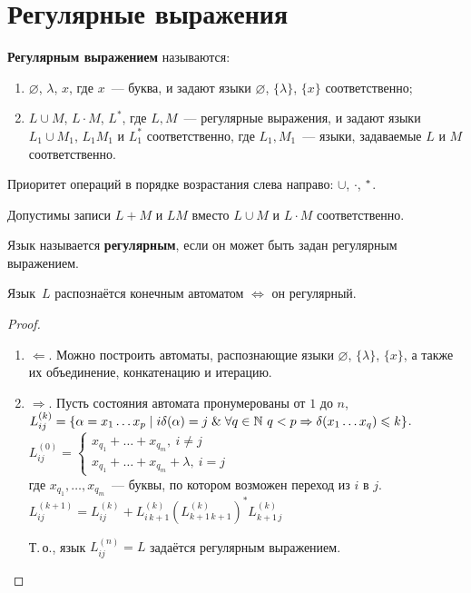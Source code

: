 \section{Регулярные выражения}
 \textbf{Регулярным выражением} называются:
\begin{enumerate}
	\item $\varnothing$, $\lambda$, $x$, где $x$~--- буква, и задают языки $\varnothing$, $\{ \lambda \}$, $\{ x \}$ соответственно;
	\item $L \cup M$, $L \cdot M$, $L^*$, где $L, M$~--- регулярные выражения, и задают языки $L_1 \cup M_1$, $L_1 M_1$ и $L_1^*$ соответственно, где $L_1, M_1$~--- языки, задаваемые $L$ и $M$ соответственно.
\end{enumerate}

Приоритет операций в порядке возрастания слева направо: $\cup$, $\cdot$, $\vphantom{L}^*$.

Допустимы записи $L + M$ и $LM$ вместо $L \cup M$ и $L \cdot M$ соответственно.

 Язык называется \textbf{регулярным}, если он может быть задан регулярным выражением.

\begin{theorem}[Клини]
Язык~$L$ распознаётся конечным автоматом $\Leftrightarrow$ он регулярный.
\end{theorem}
\begin{proof}
\begin{enumerate}
	\item $\Leftarrow$. Можно построить автоматы, распознающие языки $\varnothing$, $\{ \lambda \}$, $\{ x \}$, а также их объединение, конкатенацию и итерацию.
	\item $\Rightarrow$. Пусть состояния автомата пронумерованы от $1$ до $n$, $L_{ij}^{(k)} = \{ \alpha = x_1 \ldots x_p \mid i \delta(\alpha) = j \lAnd \forall q \in \mathbb N \ \allowbreak q < p \opbr\Rightarrow \delta(x_1 \ldots x_q) \leqslant k \}$.
		\indbase $L_{ij}^{(0)} =
		\begin{cases}
		x_{q_1} + \ldots + x_{q_m}, \ i \neq j \\
		x_{q_1} + \ldots + x_{q_m} + \lambda, \ i = j
		\end{cases}$\\
		где $x_{q_1}, \ldots, x_{q_m}$~--- буквы, по котором возможен переход из $i$ в $j$.
		\indstep $L_{ij}^{(k+1)} = L_{ij}^{(k)} + L_{i\,k+1}^{(k)} \left( L_{k+1\,k+1}^{(k)} \right)^* L_{k+1\,j}^{(k)}$
		\indend
		
	Т.\,о., язык $L_{ij}^{(n)} = L$ задаётся регулярным выражением.
\end{enumerate}
\end{proof}

